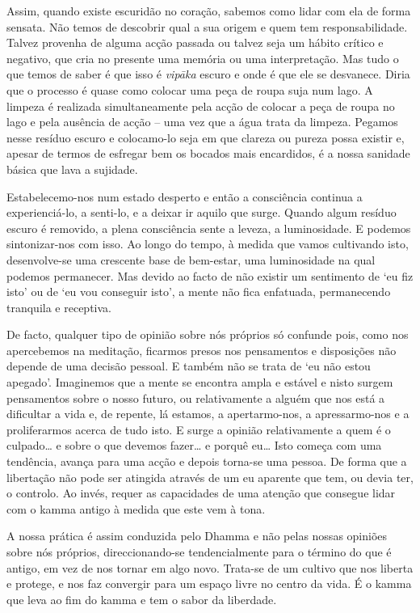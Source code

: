 Assim, quando existe escuridão no coração, sabemos como lidar com ela de forma
sensata. Não temos de descobrir qual a sua origem e quem tem responsabilidade.
Talvez provenha de alguma acção passada ou talvez seja um hábito crítico e
negativo, que cria no presente uma memória ou uma interpretação. Mas tudo o que
temos de saber é que isso é \emph{vipāka} escuro e onde é que ele se desvanece.
Diria que o processo é quase como colocar uma peça de roupa suja num lago. A
limpeza é realizada simultaneamente pela acção de colocar a peça de roupa no
lago e pela ausência de acção -- uma vez que a água trata da limpeza. Pegamos
nesse resíduo escuro e colocamo-lo seja em que clareza ou pureza possa existir
e, apesar de termos de esfregar bem os bocados mais encardidos, é a nossa
sanidade básica que lava a sujidade.

Estabelecemo-nos num estado desperto e então a consciência continua a
experienciá-lo, a senti-lo, e a deixar ir aquilo que surge. Quando algum resíduo
escuro é removido, a plena consciência sente a leveza, a luminosidade. E podemos
sintonizar-nos com isso. Ao longo do tempo, à medida que vamos cultivando isto,
desenvolve-se uma crescente base de bem-estar, uma luminosidade na qual podemos
permanecer. Mas devido ao facto de não existir um sentimento de `eu fiz isto' ou
de `eu vou conseguir isto', a mente não fica enfatuada, permanecendo tranquila e
receptiva.

\enlargethispage{\baselineskip}

De facto, qualquer tipo de opinião sobre nós próprios só confunde pois, como nos
apercebemos na meditação, ficarmos presos nos pensamentos e disposições não
depende de uma decisão pessoal. E também não se trata de `eu não estou apegado'.
Imaginemos que a mente se encontra ampla e estável e nisto surgem pensamentos
sobre o nosso futuro, ou relativamente a alguém que nos está a dificultar a vida
e, de repente, lá estamos, a apertarmo-nos, a apressarmo-nos e a proliferarmos
acerca de tudo isto. E surge a opinião relativamente a quem é o culpado\ldots{}
e sobre o que devemos fazer\ldots{} e porquê eu\ldots{} Isto começa com uma
tendência, avança para uma acção e depois torna-se uma pessoa. De forma que a
libertação não pode ser atingida através de um eu aparente que tem, ou devia
ter, o controlo. Ao invés, requer as capacidades de uma atenção que consegue
lidar com o kamma antigo à medida que este vem à tona.

A nossa prática é assim conduzida pelo Dhamma e não pelas nossas opiniões sobre
nós próprios, direccionando-se tendencialmente para o término do que é antigo,
em vez de nos tornar em algo novo. Trata-se de um cultivo que nos liberta e
protege, e nos faz convergir para um espaço livre no centro da vida. É o kamma
que leva ao fim do kamma e tem o sabor da liberdade.
